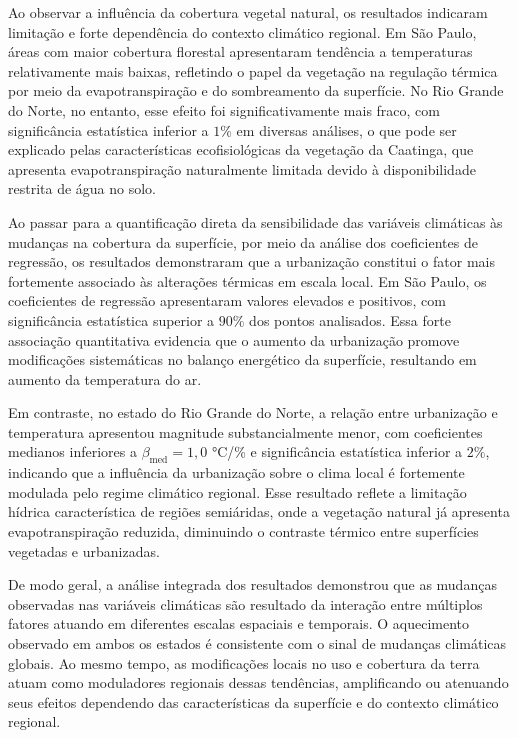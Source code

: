 Ao observar a influência da cobertura vegetal natural, os resultados indicaram limitação e forte dependência do contexto climático regional. Em São Paulo, áreas com maior cobertura florestal apresentaram tendência a temperaturas relativamente mais baixas, refletindo o papel da vegetação na regulação térmica por meio da evapotranspiração e do sombreamento da superfície. No Rio Grande do Norte, no entanto, esse efeito foi significativamente mais fraco, com significância estatística inferior a $1\%$ em diversas análises, o que pode ser explicado pelas características ecofisiológicas da vegetação da Caatinga, que apresenta evapotranspiração naturalmente limitada devido à disponibilidade restrita de água no solo.

Ao passar para a quantificação direta da sensibilidade das variáveis climáticas às mudanças na cobertura da superfície, por meio da análise dos coeficientes de regressão, os resultados demonstraram que a urbanização constitui o fator mais fortemente associado às alterações térmicas em escala local. Em São Paulo, os coeficientes de regressão apresentaram valores elevados e positivos, com significância estatística superior a $90\%$ dos pontos analisados. Essa forte associação quantitativa evidencia que o aumento da urbanização promove modificações sistemáticas no balanço energético da superfície, resultando em aumento da temperatura do ar.

Em contraste, no estado do Rio Grande do Norte, a relação entre urbanização e temperatura apresentou magnitude substancialmente menor, com coeficientes medianos inferiores a $\beta_{\mathrm{med}} = 1{,}0$ °C/\% e significância estatística inferior a $2\%$, indicando que a influência da urbanização sobre o clima local é fortemente modulada pelo regime climático regional. Esse resultado reflete a limitação hídrica característica de regiões semiáridas, onde a vegetação natural já apresenta evapotranspiração reduzida, diminuindo o contraste térmico entre superfícies vegetadas e urbanizadas.

De modo geral, a análise integrada dos resultados demonstrou que as mudanças observadas nas variáveis climáticas são resultado da interação entre múltiplos fatores atuando em diferentes escalas espaciais e temporais. O aquecimento observado em ambos os estados é consistente com o sinal de mudanças climáticas globais. Ao mesmo tempo, as modificações locais no uso e cobertura da terra atuam como moduladores regionais dessas tendências, amplificando ou atenuando seus efeitos dependendo das características da superfície e do contexto climático regional.

